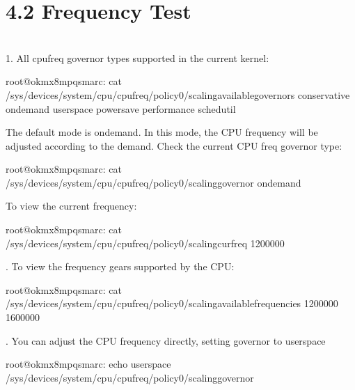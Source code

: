 \documentclass[letterpaper,10pt,openany,english]{sphinxmanual}
\begin{document}
\section{4.2 Frequency Test}
\label{\detokenize{linux-manual:frequency-test}}
\sphinxAtStartPar
{}\\
1. All cpufreq governor types supported in the current kernel:

\begin{sphinxVerbatim}[commandchars=\\\{\}]
root@ok\PYGZhy{}mx8mpq\PYGZhy{}smarc:\PYGZti{}\PYGZsh{} cat \PYGZbs{}
/sys/devices/system/cpu/cpufreq/policy0/scaling\PYGZus{}available\PYGZus{}governors
conservative ondemand userspace powersave performance schedutil
\end{sphinxVerbatim}

\sphinxAtStartPar
The default mode is ondemand. In this mode, the CPU frequency will be adjusted according to the demand. Check the current CPU freq governor type:

\begin{sphinxVerbatim}[commandchars=\\\{\}]
root@ok\PYGZhy{}mx8mpq\PYGZhy{}smarc:\PYGZti{}\PYGZsh{} cat /sys/devices/system/cpu/cpufreq/policy0/scaling\PYGZus{}governor
ondemand
\end{sphinxVerbatim}

\sphinxAtStartPar
To view the current frequency:

\begin{sphinxVerbatim}[commandchars=\\\{\}]
root@ok\PYGZhy{}mx8mpq\PYGZhy{}smarc:\PYGZti{}\PYGZsh{} cat /sys/devices/system/cpu/cpufreq/policy0/scaling\PYGZus{}cur\PYGZus{}freq
1200000
\end{sphinxVerbatim}

. To view the frequency gears supported by the CPU:

\begin{sphinxVerbatim}[commandchars=\\\{\}]
root@ok\PYGZhy{}mx8mpq\PYGZhy{}smarc:\PYGZti{}\PYGZsh{} cat \PYGZbs{}
/sys/devices/system/cpu/cpufreq/policy0/scaling\PYGZus{}available\PYGZus{}frequencies
1200000 1600000
\end{sphinxVerbatim}

. You can adjust the CPU frequency directly, setting governor to userspace

\begin{sphinxVerbatim}[commandchars=\\\{\}]
root@ok\PYGZhy{}mx8mpq\PYGZhy{}smarc:\PYGZti{}\PYGZsh{} echo userspace \PYGZgt{} \PYGZbs{}
/sys/devices/system/cpu/cpufreq/policy0/scaling\PYGZus{}governor
\end{sphinxVerbatim}
\end{document}
